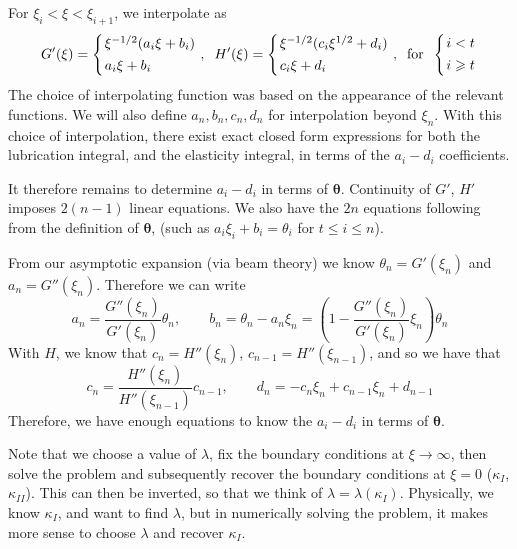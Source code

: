 \documentclass{jfm}
\begin{document}
For $\xi_i < \xi < \xi_{i+1}$, we interpolate as
\begin{equation}
\setlength{\arraycolsep}{1pt}
G'(\xi) = \left\{ \begin{array}{l}  
\xi^{-1/2}(a_i \xi + b_i) \\[4pt]
a_i \xi + b_i
 \end{array}\right., \;\;
H'(\xi) = \left\{ \begin{array}{l}  
\xi^{-1/2}(c_i \xi^{1/2} + d_i) \\[4pt]
c_i \xi + d_i
 \end{array}\right. , \;\;
\mbox{for} \;\; \left\{ \begin{array}{l}  
i<t\\[4pt]
i\geq t
\end{array}\right.
\end{equation}
The choice of interpolating function 
was based on the appearance of the relevant functions.
We will also define $a_n,b_n,c_n,d_n$ for interpolation beyond $\xi_n$.
With this choice of interpolation,
there exist exact closed form expressions for both the lubrication integral,
and the elasticity integral, in terms of the $a_i - d_i$ coefficients.

It therefore remains to determine $a_i -d_i$ in terms of $\boldsymbol{\theta}$.
Continuity of $G'$, $H'$ imposes $2(n-1)$ linear equations. 
We also have the $2n$ equations following from the definition
of $\boldsymbol{\theta}$, (such as $a_i \xi_i + b_i = \theta_i$ for 
$t\leq i \leq n$). 

From our asymptotic expansion 
(via beam theory) we know $\theta_n = G'(\xi_n)$ and $a_n = G''(\xi_n)$. 
Therefore we can write
\begin{equation}
a_n = \frac{G''(\xi_n)}{G'(\xi_n)} \theta_n, \qquad
b_n  = \theta_n - a_n \xi_n = \left( 1 - \frac{G''(\xi_n)}
{G'(\xi_n)}\xi_n \right) \theta_n
\end{equation}
With $H$, we know that $c_n = H''(\xi_n)$, $c_{n-1} = H''(\xi_{n-1})$, and
so we have that 
\begin{equation}
c_n = \frac{H''(\xi_n)}{H''(\xi_{n-1})} c_{n-1}, \qquad
d_n = -c_n \xi_n + c_{n-1}\xi_n + d_{n-1}
\end{equation}
Therefore, we have enough equations to know the $a_i-d_i$ in terms of 
$\boldsymbol{\theta}$.

Note that we choose a value of $\lambda$, fix the boundary conditions
at $\xi \to \infty$, then solve the problem and subsequently recover
the boundary conditions at $\xi=0$ ($\kappa_I$, $\kappa_{II}$).
This can then be inverted, so that we think of $\lambda = \lambda(\kappa_I)$.
Physically, we know $\kappa_I$, and want to find $\lambda$, but in numerically
solving the problem, it makes more sense to choose $\lambda$ and recover 
$\kappa_I$.
\end{document}
